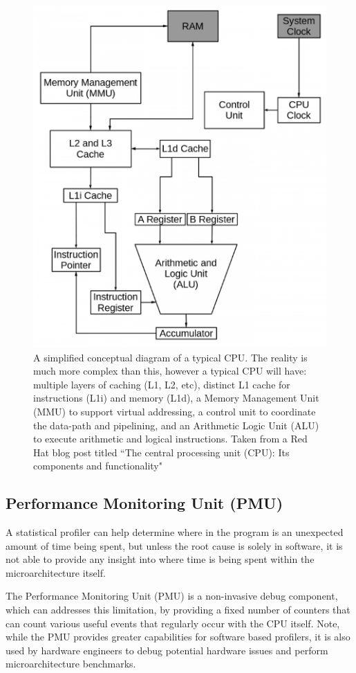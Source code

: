 {\begin{figure}[h!]
    \centering
    \includegraphics[width=0.7\linewidth]{redhat_cpu_vis}
    \caption{A simplified conceptual diagram of a typical CPU. The reality is much more complex than this, however a typical CPU will have: multiple layers of caching (L1, L2, etc), distinct L1 cache for instructions (L1i) and memory (L1d), a Memory Management Unit (MMU) to support virtual addressing, a control unit to coordinate the data-path and pipelining, and an Arithmetic Logic Unit (ALU) to execute arithmetic and logical instructions. Taken from a Red Hat blog post titled ``The central processing unit (CPU): Its components and functionality" \cite{BlogRedHatCPU} } 
    \label{fig:cpu_vis}
\end{figure}

\subsection{Performance Monitoring Unit (PMU)}\label{sect:pmu}

A statistical profiler can help determine where in the program is an unexpected amount of time being spent, but unless the root cause is solely in software, it is not able to provide any insight into where time is being spent within the microarchitecture itself.

The Performance Monitoring Unit (PMU) is a non-invasive debug component, which can addresses this limitation, by providing a fixed number of counters that can count various useful events that regularly occur with the CPU itself. Note, while the PMU provides greater capabilities for software based profilers, it is also used by hardware engineers to debug potential hardware issues and perform microarchitecture benchmarks.

}
